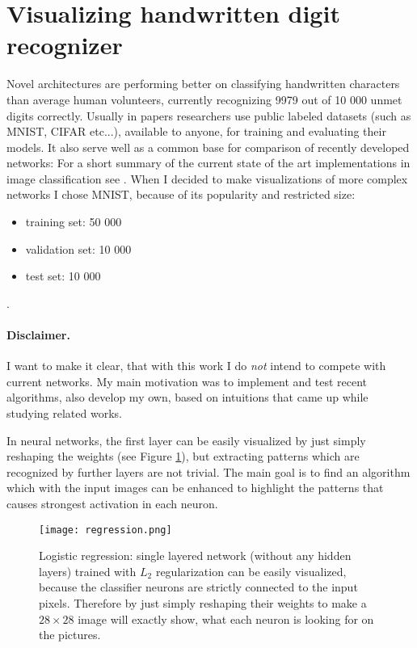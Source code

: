 \clearpage
\section{Visualizing handwritten digit recognizer}
Novel architectures are performing better on classifying handwritten characters than average human volunteers, currently recognizing 9979 out of 10 000 unmet digits correctly. 
Usually in papers researchers use public labeled datasets (such as MNIST\cite{mnist}, CIFAR\cite{cifar} etc...), available to anyone, for training and evaluating their models.
It also serve well as a common base for comparison of recently developed networks: 
For a short summary of the current state of the art implementations in image classification see \cite{bestmnist}.
When I decided to make visualizations of more complex networks I chose MNIST, because of its popularity and restricted size: 
\begin{itemize}
\item[] training set: 50 000
\item[] validation set: 10 000
\item[] test set: 10 000
\end{itemize}.

\paragraph{Disclaimer.} I want to make it clear, that with this work I do \emph{not} intend to compete with current networks.
My main motivation was to implement and test recent algorithms, also develop my own, based on intuitions that came up while studying related works.

In neural networks, the first layer can be easily visualized by just simply reshaping the weights (see Figure \ref{fig:regression}), 
but extracting patterns which are recognized by further layers are not trivial. 
The main goal is to find an algorithm which with the input images can be 
enhanced to highlight the patterns that causes strongest activation in each neuron.


\begin{figure}
    \centering
    \texttt{[image: regression.png]}
    \caption{Logistic regression: single layered network (without any hidden layers) trained with $L_2$ regularization can be easily visualized, because the classifier neurons are strictly connected to the input pixels. Therefore by just simply reshaping their weights to make a $28 \times 28$ image will exactly show, what each neuron is looking for on the pictures.}
    \label{fig:regression}
\end{figure}

